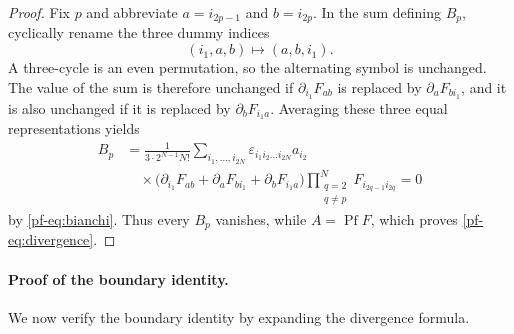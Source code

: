 \documentclass[11pt,reqno]{amsart}
\numberwithin{equation}{section}
\theoremstyle{definition}
\theoremstyle{remark}
\newcommand{\Pf}{\operatorname{Pf}}
\begin{document}
\begin{proof}
Fix $p$ and abbreviate
$a=i_{2p-1}$ and $b=i_{2p}$.  In the sum defining $B_p$, cyclically rename
the three dummy indices
\[
 (i_1,a,b)\longmapsto(a,b,i_1).
\]
A three-cycle is an even permutation, so the alternating symbol is
unchanged.  The value of the sum is therefore unchanged if
$\partial_{i_1}F_{ab}$ is replaced by $\partial_aF_{bi_1}$, and it is also
unchanged if it is replaced by $\partial_bF_{i_1a}$.  Averaging these three
equal representations yields
\begin{align*}
 B_p
 &=\frac{1}{3\cdot2^{N-1}N!}
 \sum_{i_1,\ldots,i_{2N}}
 \varepsilon_{i_1i_2\ldots i_{2N}}a_{i_2}\\
 &\quad\times
 \bigl(
 \partial_{i_1}F_{ab}+\partial_aF_{bi_1}
 +\partial_bF_{i_1a}
 \bigr)
 \prod_{\substack{q=2\\q\ne p}}^N
 F_{i_{2q-1}i_{2q}}=0
\end{align*}
by \eqref{pf-eq:bianchi}.  Thus every $B_p$ vanishes, while $A=\Pf F$,
which proves \eqref{pf-eq:divergence}.
\end{proof}

\paragraph{Proof of the boundary identity.}

We now verify the boundary identity by expanding the divergence formula.
\end{document}
